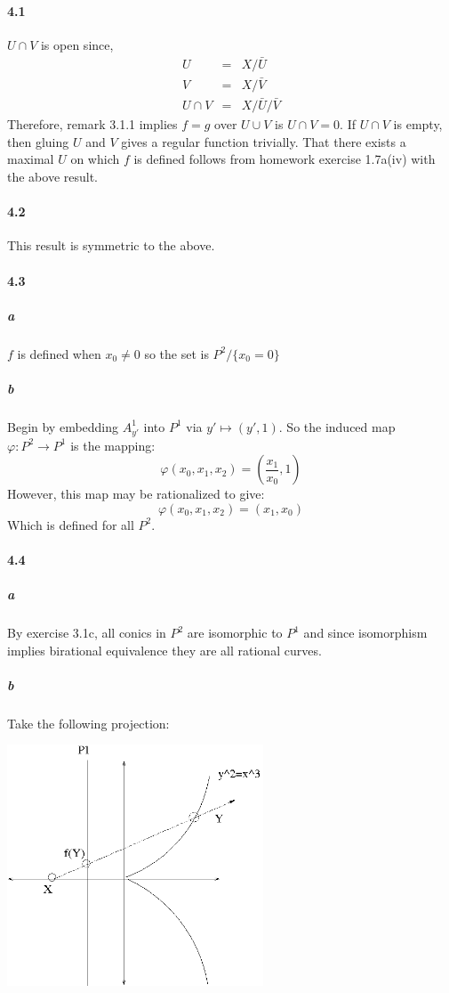 \documentclass{article}
\begin{document}
\paragraph{4.1}

$U \cap V$ is open since,
\begin{eqnarray*}
U & = & X \slash \bar{U} \\
V & = & X \slash \bar{V} \\
U \cap V & = & X \slash \bar{U} \slash \bar{V}
\end{eqnarray*}
Therefore, remark 3.1.1 implies $f=g$ over $U \cup V$ is $U \cap V = 0$.  If $U \cap V$ is empty, then gluing $U$ and $V$ gives a regular function trivially.  That there exists a maximal $U$ on which $f$ is defined follows from homework exercise 1.7a(iv) with the above result.

\paragraph{4.2}
This result is symmetric to the above.

\paragraph{4.3}

\subparagraph{a} $f$ is defined when $x_0 \neq 0$ so the set is $P^2 \slash \{ x_0 = 0 \}$

\subparagraph{b} Begin by embedding $A^1_{y'}$ into $P^1$ via $y' \mapsto (y', 1)$.  So the induced map $\varphi : P^2 \to P^1$ is the mapping:
\[ \varphi(x_0, x_1, x_2) = (\frac{x_1}{x_0}, 1) \]
However, this map may be rationalized to give:
\[ \varphi(x_0, x_1, x_2) = (x_1, x_0) \]
Which is defined for all $P^2$.

\paragraph{4.4}

\subparagraph{a}
By exercise 3.1c, all conics in $P^2$ are isomorphic to $P^1$ and since isomorphism implies birational equivalence they are all rational curves.

\subparagraph{b}
Take the following projection:

\begin{center}
\includegraphics[width=3in]{birational.png}
\end{center}
\end{document}
